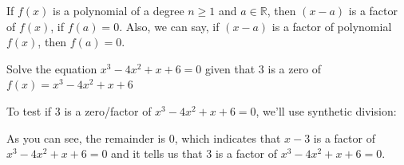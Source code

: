 \label{les_1_unit_4:the_factor_theorem}

\begin{theorem}
  \label{thrm:the_factor_theorem}

  If $f(x)$ is a polynomial of a degree $n \ge 1$ and $a \in \mathbb{R}$, then
  $(x - a)$ is a factor of $f(x)$, if $f(a) = 0$. Also, we can say, if $(x - a)$ 
  is a factor of polynomial $f(x)$, then $f(a) = 0$.
\end{theorem}

\begin{example}
  \label{exm:the_factor_theorem}

  Solve the equation $x^{3} - 4x^{2} + x + 6 = 0$ given that $3$ is a zero of
  $f(x) = x^{3} - 4x^{2} + x + 6$

  To test if $3$ is a zero/factor of $x^{3} - 4x^{2} + x + 6 = 0$, we'll use
  synthetic division:

  \begin{center}
  \end{center}

  As you can see, the remainder is $0$, which indicates that $x - 3$ is a factor
  of $x^{3} - 4x^{2} + x + 6 = 0$ and it tells us that $3$ is a factor of
  $x^{3} - 4x^{2} + x + 6 = 0$.
\end{example}

\newpage

